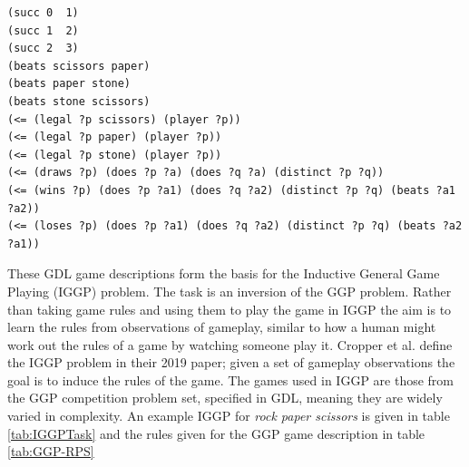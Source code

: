 \begin{listing}[ht]
\begin{Verbatim}[frame=single,fontsize=\footnotesize]
(succ 0  1)
(succ 1  2)
(succ 2  3)
(beats scissors paper)
(beats paper stone)
(beats stone scissors)
(<= (legal ?p scissors) (player ?p))
(<= (legal ?p paper) (player ?p))
(<= (legal ?p stone) (player ?p))
(<= (draws ?p) (does ?p ?a) (does ?q ?a) (distinct ?p ?q))
(<= (wins ?p) (does ?p ?a1) (does ?q ?a2) (distinct ?p ?q) (beats ?a1 ?a2))
(<= (loses ?p) (does ?p ?a1) (does ?q ?a2) (distinct ?p ?q) (beats ?a2 ?a1))
\end{Verbatim}
\caption{
A sample of rules from the GDL description of Rock Paper Scissors. The $?$ indicates a variable and $<=$ indicates an implication with the first expression after being the head and the conjugation of the rest making up the body
}
\label{lst:GDL}
\end{listing}



These GDL game descriptions form the basis for the Inductive General Game Playing (IGGP) problem\cite{Cropper/IGGP}. The task is an inversion of the GGP problem. Rather than taking game rules and using them to play the game in IGGP the aim is to learn the rules from observations of gameplay, similar to how a human might work out the rules of a game by watching someone play it. Cropper et al. define the IGGP problem in their 2019 paper; given a set of gameplay observations the goal is to induce the rules of the game\cite{Cropper/IGGP}. The games used in IGGP are those from the GGP competition problem set, specified in GDL, meaning they are widely varied in complexity. An example IGGP for \textit{rock paper scissors} is given in table \ref{tab:IGGPTask} and the rules given for the GGP game description in table \ref{tab:GGP-RPS}

